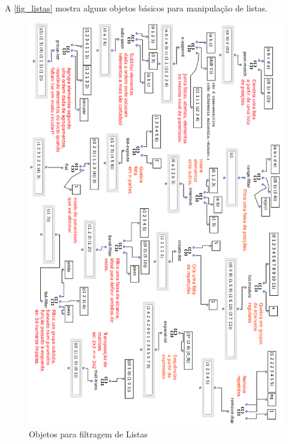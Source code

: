 \documentclass[
	12pt,				%
	openright,			%
	twoside,			%
	a4paper,			%
	english,			%
	french,				%
	spanish,			%
	brazil				%
	]{abntex2}
\begin{document}
A \autoref{fig_listas} mostra alguns objetos básicos para manipulação de listas.

\begin{figure}[!h]
	\caption{\label{fig_listas}Objetos para filtragem de Listas }
	\begin{center}
	    \includegraphics[scale=0.55]{OMPD/OM-listasDELADO.png}
	\end{center}
\end{figure}
\end{document}

